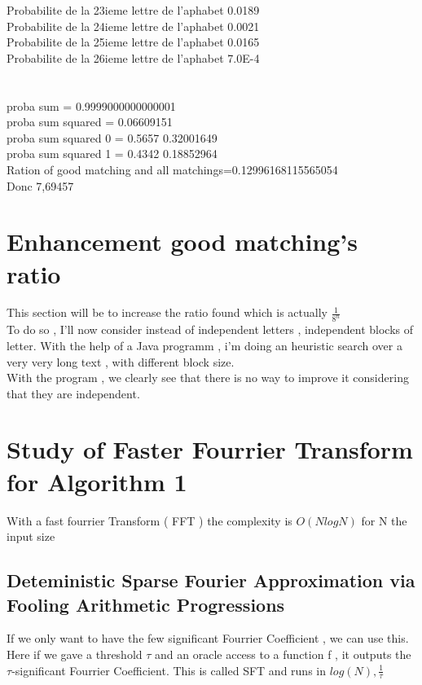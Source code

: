 \documentclass{article}
\begin{document}
Probabilite de la 23ieme lettre de l'aphabet 0.0189\\
Probabilite de la 24ieme lettre de l'aphabet 0.0021\\
Probabilite de la 25ieme lettre de l'aphabet 0.0165\\
Probabilite de la 26ieme lettre de l'aphabet 7.0E-4\\
\\
\\
proba sum = 0.9999000000000001\\
proba sum squared = 0.06609151\\
proba sum squared 0 = 0.5657 0.32001649\\
proba sum squared 1 = 0.4342 0.18852964\\
Ration of good matching and all matchings=0.12996168115565054\\
Donc 7,69457

\section{Enhancement good matching's ratio}

This section will be to increase the ratio found which is actually $\frac{1}{8^n}$\\
To do so , I'll now consider instead of independent letters , independent blocks of letter.
With the help of a Java programm , i'm doing an heuristic search over a very very long text , with different block size.\\
With the program , we clearly see that there is no way to improve it considering that they are independent.\\

\section{Study of Faster Fourrier Transform for Algorithm 1}
With a fast fourrier Transform ( FFT ) the complexity is $O(NlogN)$ for N the input size\\
\subsection{Deteministic Sparse Fourier Approximation via Fooling Arithmetic Progressions}
If we only want to have the few significant Fourrier Coefficient , we can use this.\\
Here if we gave a threshold $\tau$ and an oracle access to a function f , it outputs the $\tau$-significant Fourrier Coefficient. This is called SFT and runs in $log(N) ,\frac{1}{\tau}$\\
\end{document}

